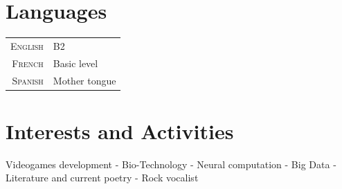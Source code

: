 \documentclass[a4paper,10pt]{article} %
\begin{document}

\section{Languages}
\begin{tabular}{r|p{11cm}}
\textsc{English} & B2\\
\textsc{French} & Basic level\\ 
\textsc{Spanish} & Mother tongue\\

\end{tabular}

\framebox[\linewidth]{\textcolor{linkcolour}{Experience working in international
 teams}}\par





\section{Interests and Activities}
Videogames development - Bio-Technology - Neural computation - Big Data -
Literature and current poetry - Rock vocalist
\end{document}
